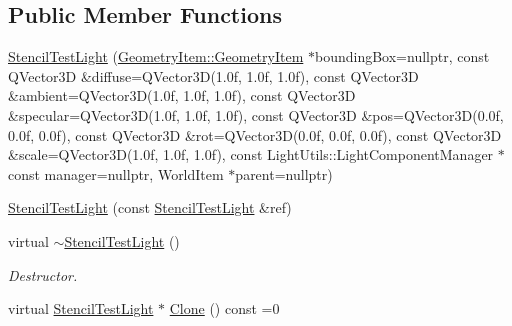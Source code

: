 \subsection*{Public Member Functions}
\begin{DoxyCompactItemize}
\item 
\mbox{\hyperlink{class_geometry_engine_1_1_geometry_world_item_1_1_geometry_light_1_1_stencil_test_light_a8bd4d1178930d5feb3984e127fec1f47}{Stencil\+Test\+Light}} (\mbox{\hyperlink{class_geometry_engine_1_1_geometry_world_item_1_1_geometry_item_1_1_geometry_item}{Geometry\+Item\+::\+Geometry\+Item}} $\ast$bounding\+Box=nullptr, const Q\+Vector3D \&diffuse=Q\+Vector3D(1.\+0f, 1.\+0f, 1.\+0f), const Q\+Vector3\+D \&ambient=\+Q\+Vector3\+D(1.\+0f, 1.\+0f, 1.\+0f), const Q\+Vector3\+D \&specular=\+Q\+Vector3\+D(1.\+0f, 1.\+0f, 1.\+0f), const Q\+Vector3\+D \&pos=\+Q\+Vector3\+D(0.\+0f, 0.\+0f, 0.\+0f), const Q\+Vector3\+D \&rot=\+Q\+Vector3\+D(0.\+0f, 0.\+0f, 0.\+0f), const Q\+Vector3\+D \&scale=\+Q\+Vector3\+D(1.\+0f, 1.\+0f, 1.\+0f), const Light\+Utils\+::\+Light\+Component\+Manager $\ast$const manager=nullptr, World\+Item $\ast$parent=nullptr)
\item 
\mbox{\hyperlink{class_geometry_engine_1_1_geometry_world_item_1_1_geometry_light_1_1_stencil_test_light_a790e1319f7b03e4b2fb51352b7fe370e}{Stencil\+Test\+Light}} (const \mbox{\hyperlink{class_geometry_engine_1_1_geometry_world_item_1_1_geometry_light_1_1_stencil_test_light}{Stencil\+Test\+Light}} \&ref)
\item 
\mbox{\label{class_geometry_engine_1_1_geometry_world_item_1_1_geometry_light_1_1_stencil_test_light_a0bacf4275c92cb404e4b81cff9c0a3fd}} 
virtual \mbox{\hyperlink{class_geometry_engine_1_1_geometry_world_item_1_1_geometry_light_1_1_stencil_test_light_a0bacf4275c92cb404e4b81cff9c0a3fd}{$\sim$\+Stencil\+Test\+Light}} ()
\begin{DoxyCompactList}\small\item\em Destructor. \end{DoxyCompactList}\item 
virtual \mbox{\hyperlink{class_geometry_engine_1_1_geometry_world_item_1_1_geometry_light_1_1_stencil_test_light}{Stencil\+Test\+Light}} $\ast$ \mbox{\hyperlink{class_geometry_engine_1_1_geometry_world_item_1_1_geometry_light_1_1_stencil_test_light_a6434a228dc64537ff9984c82eaf8ab07}{Clone}} () const =0
\end{DoxyCompactItemize}
